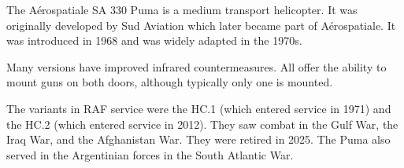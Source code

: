 

The Aérospatiale SA 330 Puma is a medium transport helicopter. It was originally developed by Sud Aviation which later became part of Aérospatiale. It was introduced in 1968 and was widely adapted in the 1970s.

Many versions have improved infrared countermeasures. All offer the ability to mount guns on both doors, although typically only one is mounted.

The variants in RAF service were the HC.1 (which entered service in 1971) and the HC.2 (which entered service in 2012). They saw combat in the Gulf War, the Iraq War, and the Afghanistan War. They were retired in 2025. The Puma also served in the Argentinian forces in the South Atlantic War.
